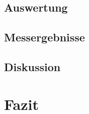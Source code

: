 \documentclass[12pt]{scrartcl}
\begin{document}
\subsection{Auswertung}
\subsection{Messergebnisse}
\subsection{Diskussion}


\section{Fazit}


\end{document}
